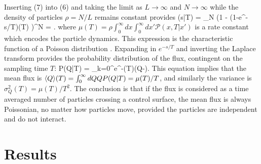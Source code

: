 Inserting (7) into (6) and taking the limit as $L\rightarrow \infty$ and $N \rightarrow \infty$ while the density of particles $\rho = N/L$ remains constant provides
\be {}(s|T) = \lim_{N \rightarrow \infty} \Big(1 - \big(1-e^{-s/T}\big)\mu(T) \Big)^N = \exp {}.\ee
where $\mu(T) = \rho \int_0^\infty dx \int_0^\infty dx' \mathcal{P}(x,T|x')$ is a rate constant which encodes the particle dynamics. This expression is the characteristic function of a Poisson distribution \citep{Cox1965}.
Expanding in $e^{-s/T}$ and inverting the Laplace transform provides the probability distribution of the flux, contingent on the sampling time $T$:
\be P(Q|T) = \sum_{k=0}^\infty {}e^{-\mu(T)}\delta(Q-).\ee
This equation implies that the mean flux is $\langle Q \rangle(T) = \int_0^\infty dQ Q P(Q|T) = \mu(T)/T$, and similarly the variance is $\sigma_Q^2(T) = \mu(T)/T^2$. 
The conclusion is that if the flux is considered as a time averaged number of particles crossing a control surface, the mean flux is always Poissonian, no matter how particles move, provided the particles are independent and do not interact.


\section{Results \label{sec:res}}
